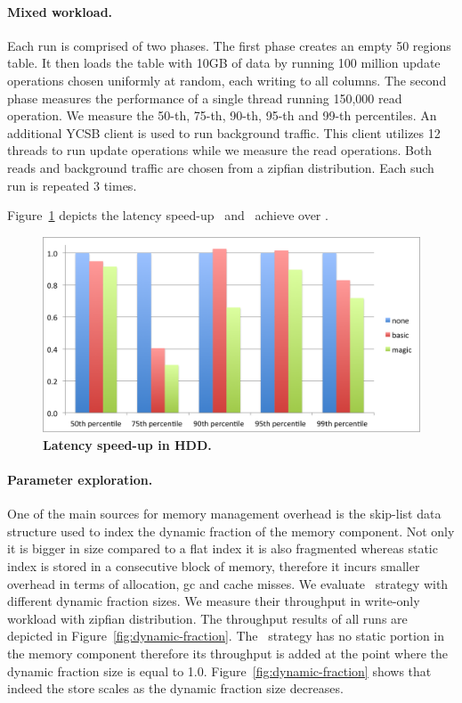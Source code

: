 {\paragraph{Mixed workload.}
Each run is comprised of two phases. 
The first phase creates an empty 50 regions table. It then loads the table with 10GB of data by running 100 million update operations chosen uniformly at random, each writing to all columns. 
The second phase measures the performance of a single thread running 150,000 read operation. 
We measure the 50-th, 75-th, 90-th, 95-th and 99-th percentiles.
An additional YCSB client is used to run background traffic. 
This client utilizes 12 threads to run update operations while we measure the read operations. 
Both reads and background traffic are chosen from a zipfian distribution.
Each such run is repeated 3 times. 

Figure~\ref{fig:latency-speedup-hdd} depicts the latency speed-up \basic\ and \magic\ achieve over \none.

\begin{figure}[htb]
\includegraphics[width=\figw]{Figs/latency-speedup-hdd.png}
\caption{{\bf Latency speed-up in HDD.} 
}
\label{fig:latency-speedup-hdd}
\end{figure}

\paragraph{Parameter exploration.}
One of the main sources for memory management overhead is the skip-list data structure used to index the dynamic fraction of the memory component.
Not only it is bigger in size compared to a flat index it is also fragmented whereas static index is stored in a consecutive block of memory, therefore it incurs smaller overhead in terms of allocation, gc and cache misses.
We evaluate \basic\ strategy with different dynamic fraction sizes. We measure their throughput in write-only workload with zipfian distribution.
The throughput results of all runs are depicted in  Figure~\ref{fig:dynamic-fraction}. 
The \none\ strategy has no static portion in the memory component therefore its throughput is added at the point where the dynamic fraction size is equal to 1.0.
Figure~\ref{fig:dynamic-fraction} shows that indeed the store scales as the dynamic fraction size decreases. 

}
